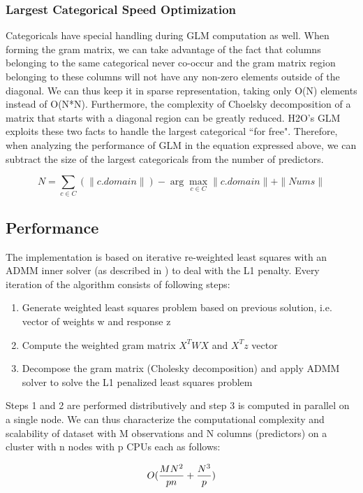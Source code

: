 \subsubsection{Largest Categorical Speed Optimization}

Categoricals have special handling during GLM computation as well. When forming the gram matrix, we can take
advantage of the fact that columns belonging to the same categorical never co-occur and the gram matrix region
belonging to these columns will not have any non-zero elements outside of the diagonal. We can thus keep it in
sparse representation, taking only O(N) elements instead of O(N*N). Furthermore, the complexity of Choelsky
decomposition of a matrix that starts with a diagonal region can be greatly reduced. H2O's GLM exploits these two
facts to handle the largest categorical ``for free". Therefore, when analyzing the performance of GLM in the
equation expressed above, we can subtract the size of the largest categoricals from the number of predictors.

$$N = \sum_{c \in C} (\|c.domain\|) - \arg\max_{c \in C} \|c.domain\| + \|Nums\| $$

\subsection{Performance}

The implementation is based on iterative re-weighted least squares with an ADMM inner solver (as described
in ) to deal with the L1 penalty. Every iteration of the algorithm consists of following steps:

\begin{enumerate} 
\item Generate weighted least squares problem based on previous solution, i.e. vector of weights w and response z 
\item Compute the weighted gram matrix $X^TWX$ and $X^Tz$ vector
\item Decompose the gram matrix (Cholesky decomposition) and apply ADMM solver to solve the L1 penalized least squares problem
\end{enumerate}

Steps 1 and 2 are performed distributively and step 3 is computed in parallel on a single node. We can thus
characterize the computational complexity and scalability of dataset with M observations and N columns (predictors)
on a cluster with n nodes with p CPUs each as follows:

\[ O({MN^2 \over pn} + {N^3 \over p})\]

